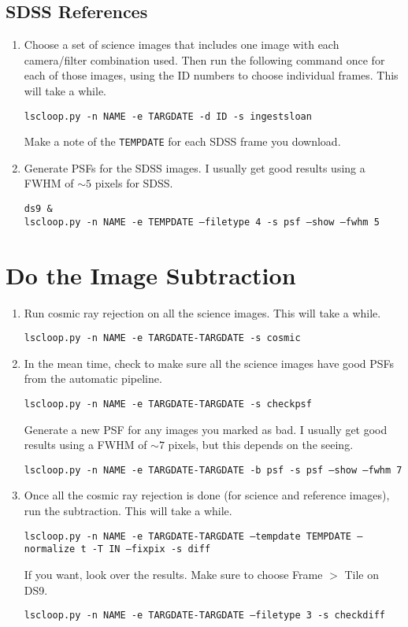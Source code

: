 \subsection{SDSS References}
\begin{enumerate}

\item Choose a set of science images that includes one image with each camera/filter combination used. Then run the following command once for each of those images, using the ID numbers to choose individual frames. This will take a while.

{\tt lscloop.py -n NAME -e TARGDATE -d ID -s ingestsloan }

Make a note of the {\tt TEMPDATE} for each SDSS frame you download.

\item Generate PSFs for the SDSS images. I usually get good results using a FWHM of $\sim 5$ pixels for SDSS.

{\tt ds9 \& } \\
{\tt lscloop.py -n NAME -e TEMPDATE --filetype 4 -s psf --show --fwhm 5 }

\end{enumerate}

\section{Do the Image Subtraction}

\begin{enumerate}
\item Run cosmic ray rejection on all the science images. This will take a while.

{\tt lscloop.py -n NAME -e TARGDATE-TARGDATE -s cosmic}

\item In the mean time, check to make sure all the science images have good PSFs from the automatic pipeline.

{\tt lscloop.py -n NAME -e TARGDATE-TARGDATE -s checkpsf}

Generate a new PSF for any images you marked as bad. I usually get good results using a FWHM of $\sim 7$ pixels, but this depends on the seeing.

{\tt lscloop.py -n NAME -e TARGDATE-TARGDATE -b psf -s psf --show --fwhm 7}

\item Once all the cosmic ray rejection is done (for science and reference images), run the subtraction. This will take a while.

{\tt lscloop.py -n NAME -e TARGDATE-TARGDATE --tempdate TEMPDATE --normalize t -T IN --fixpix -s diff}

If you want, look over the results. Make sure to choose Frame $>$ Tile on DS9.

{\tt lscloop.py -n NAME -e TARGDATE-TARGDATE --filetype 3 -s checkdiff}
\end{enumerate}

